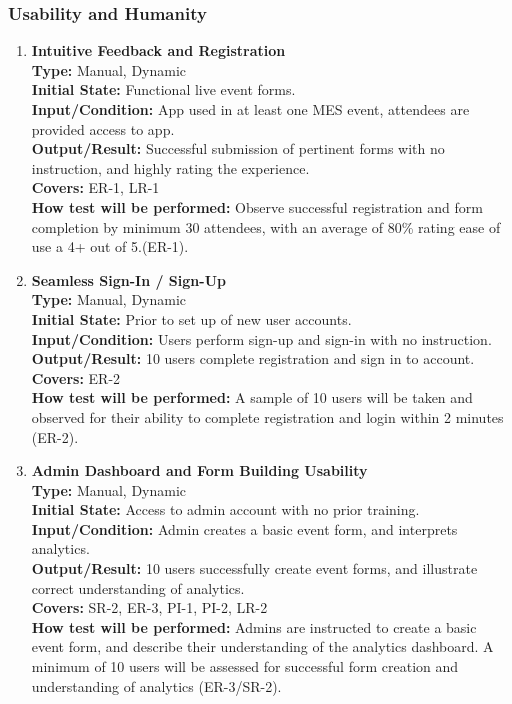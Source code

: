 \documentclass[12pt, titlepage]{article}
\begin{document}
\subsubsection{Usability and Humanity}
\begin{enumerate}[label=\bfseries UH-\arabic*:, wide=0pt]
  \item \label{test-UH1} \textbf{Intuitive Feedback and Registration}\\[2mm]
    {\bf Type:} Manual, Dynamic\\
    {\bf Initial State:} Functional live event forms.\\
    {\bf Input/Condition:} App used in at least one MES event, attendees are provided access to app.\\
    {\bf Output/Result:} Successful submission of pertinent forms with no instruction, and highly rating the experience.\\
    {\bf Covers:} ER-1, LR-1\\
    {\bf How test will be performed:} Observe successful registration and form completion by minimum 30 attendees, with an average of 80\% rating ease of use a 4+ out of 5.(ER-1).

  \item \label{test-UH2} \textbf{Seamless Sign-In / Sign-Up}\\[2mm]
    {\bf Type:} Manual, Dynamic\\
    {\bf Initial State:} Prior to set up of new user accounts.\\
    {\bf Input/Condition:} Users perform sign-up and sign-in with no instruction.\\
    {\bf Output/Result:} 10 users complete registration and sign in to account.\\
    {\bf Covers:} ER-2\\
    {\bf How test will be performed:} A sample of 10 users will be taken and observed for their ability to complete registration and login within 2 minutes (ER-2).

  \item \label{test-UH3} \textbf{Admin Dashboard and Form Building Usability}\\[2mm]
    {\bf Type:} Manual, Dynamic\\
    {\bf Initial State:} Access to admin account with no prior training.\\
    {\bf Input/Condition:} Admin creates a basic event form, and interprets analytics.\\
    {\bf Output/Result:} 10 users successfully create event forms, and illustrate correct understanding of analytics.\\
    {\bf Covers:} SR-2, ER-3, PI-1, PI-2, LR-2\\
    {\bf How test will be performed:} Admins are instructed to create a basic event form, and describe their understanding of the analytics dashboard. A minimum of 10 users will be assessed for successful form creation and understanding of analytics (ER-3/SR-2).


\end{enumerate}
\end{document}
